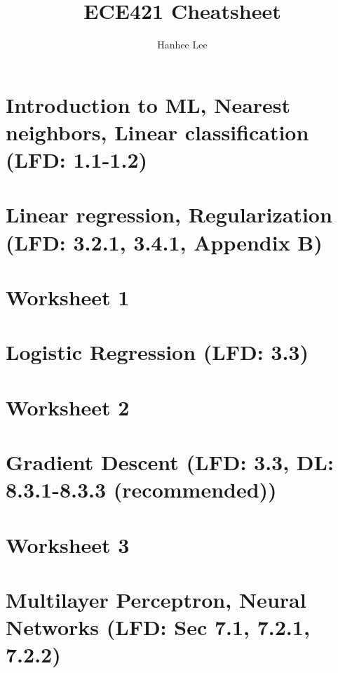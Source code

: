 \documentclass{article}
\title{ECE421 Cheatsheet}
\author{Hanhee Lee}
\begin{document}
\maketitle

\tableofcontents

\listoffigures

\listoftables

\section{Introduction to ML, Nearest neighbors, Linear classification (LFD: 1.1-1.2)}

\newpage

\section{Linear regression, Regularization (LFD: 3.2.1, 3.4.1, Appendix B)}

\newpage

\section{Worksheet 1}

\newpage

\section{Logistic Regression (LFD: 3.3)}

\newpage

\section{Worksheet 2}

\newpage

\section{Gradient Descent (LFD: 3.3, DL: 8.3.1-8.3.3 (recommended))}

\newpage

\section{Worksheet 3}

\newpage

\section{Multilayer Perceptron, Neural Networks (LFD: Sec 7.1, 7.2.1, 7.2.2)}

\newpage
\end{document}
